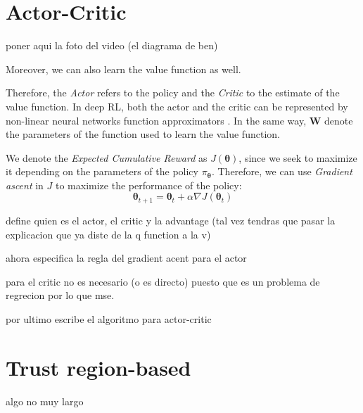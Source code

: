 \documentclass[twoside,twocolumn]{article}
\begin{document}
\section{Actor-Critic}

poner aqui la foto del video (el diagrama de ben)

Moreover, we can also learn the value function as well.

Therefore, the \emph{Actor} refers to the policy and the \emph{Critic} to the estimate of the value function. In deep RL, both the actor and the critic can be represented by non-linear neural networks function approximators \cite{mnih2016asynchronous}.
 In the same way, $\boldsymbol{W}$ denote the parameters of the function used to learn the value function.

We denote the \emph{Expected Cumulative Reward} as $J(\boldsymbol{\theta})$, since we seek to maximize it depending on the parameters of the policy $\pi_{\boldsymbol{\theta}}$. Therefore, we can use \emph{Gradient ascent} in $J$ to maximize the performance of the policy:
\begin{equation}
  \boldsymbol{\theta}_{t+1} = \boldsymbol{\theta}_{t} + \alpha \nabla J(\boldsymbol{\theta}_t)
\end{equation}

define quien es el actor, el critic y la advantage (tal vez tendras que pasar la explicacion que ya diste de la q function a la v)

ahora especifica la regla del gradient acent para el actor

para el critic no es necesario (o es directo) puesto que es un problema de regrecion por lo que mse.

por ultimo escribe el algoritmo para actor-critic

\section{Trust region-based}

algo no muy largo


\printbibliography

\end{document}
